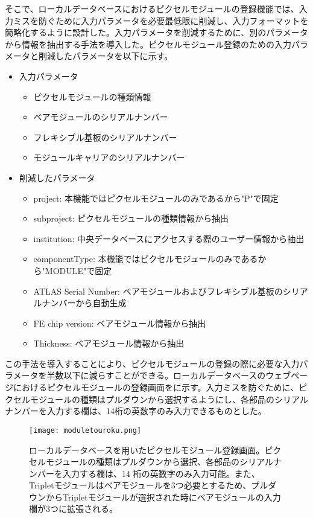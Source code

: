 そこで、ローカルデータベースにおけるピクセルモジュールの登録機能では、入力ミスを防ぐために入力パラメータを必要最低限に削減し、入力フォーマットを簡略化するように設計した。入力パラメータを削減するために、別のパラメータから情報を抽出する手法を導入した。ピクセルモジュール登録のための入力パラメータと削減したパラメータを以下に示す。
\begin{itemize}
  \item 入力パラメータ
  \begin{itemize}
    \item ピクセルモジュールの種類情報
    \item ベアモジュールのシリアルナンバー
    \item フレキシブル基板のシリアルナンバー
    \item モジュールキャリアのシリアルナンバー
  \end{itemize}
  \item 削減したパラメータ
  \begin{itemize}
  \item project: 本機能ではピクセルモジュールのみであるから"P"で固定
  \item subproject: ピクセルモジュールの種類情報から抽出
  \item institution: 中央データベースにアクセスする際のユーザー情報から抽出
  \item componentType: 本機能ではピクセルモジュールのみであるから"MODULE"で固定
  \item ATLAS Serial Number: ベアモジュールおよびフレキシブル基板のシリアルナンバーから自動生成
  \item FE chip version: ベアモジュール情報から抽出
  \item Thickness: ベアモジュール情報から抽出
  \end{itemize}
\end{itemize}

この手法を導入することにより、ピクセルモジュールの登録の際に必要な入力パラメータを半数以下に減らすことができる。ローカルデータベースのウェブページにおけるピクセルモジュールの登録画面をに示す。入力ミスを防ぐために、ピクセルモジュールの種類はプルダウンから選択するようにし、各部品のシリアルナンバーを入力する欄は、14桁の英数字のみ入力できるものとした。

\begin{figure}[tbp]
  \centering
  \texttt{[image: moduletouroku.png]}
  \caption[ローカルデータベースを用いたピクセルモジュール登録画面]{ローカルデータベースを用いたピクセルモジュール登録画面。ピクセルモジュールの種類はプルダウンから選択、各部品のシリアルナンバーを入力する欄は、14 桁の英数字のみ入力可能。また、Tripletモジュールはベアモジュールを3つ必要とするため、プルダウンからTripletモジュールが選択された時にベアモジュールの入力欄が3つに拡張される。}
  \label{fig:module-touroku-gamen}
\end{figure}

